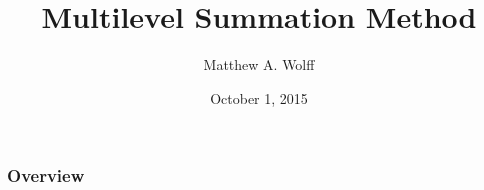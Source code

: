 \documentclass{beamer}
\title[Multilevel Summation Method]{Multilevel Summation Method}
\author{Matthew A. Wolff} %
\institute[Purdue University] %
{
	Purdue University \\ %
	\medskip
	\textit{wolff1@purdue.edu} %
}
\date{October 1, 2015} %
\begin{document}
\begin{frame}
	\titlepage %
\end{frame}

\begin{frame}
	\frametitle{Overview} %
	\tableofcontents %
\end{frame}

%
%
\end{document}
